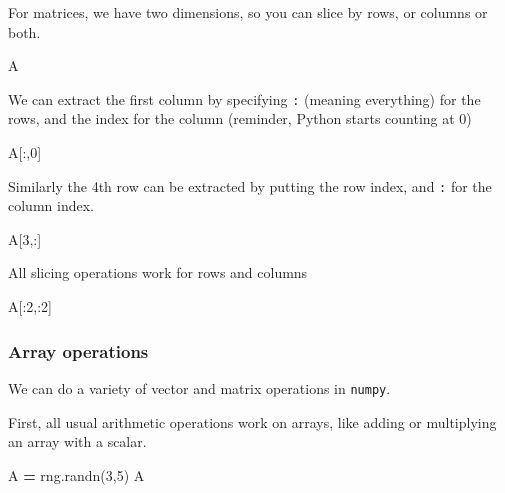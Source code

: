 \documentclass[
  letterpaper,
]{scrbook}
\newenvironment{Shaded}{\begin{snugshade}}{\end{snugshade}}
\newcommand{\DecValTok}[1]{\textcolor[rgb]{0.00,0.00,0.81}{#1}}
\newcommand{\NormalTok}[1]{#1}
\newcommand{\OperatorTok}[1]{\textcolor[rgb]{0.81,0.36,0.00}{\textbf{#1}}}
\begin{document}
For matrices, we have two dimensions, so you can slice by rows, or columns or both.

\begin{Shaded}
\begin{Highlighting}[]
\NormalTok{A}
\end{Highlighting}
\end{Shaded}

We can extract the first column by specifying \texttt{:} (meaning everything) for the rows, and the index for the column (reminder, Python starts counting at 0)

\begin{Shaded}
\begin{Highlighting}[]
\NormalTok{A[:,}\DecValTok{0}\NormalTok{]}
\end{Highlighting}
\end{Shaded}

Similarly the 4th row can be extracted by putting the row index, and \texttt{:} for the column index.

\begin{Shaded}
\begin{Highlighting}[]
\NormalTok{A[}\DecValTok{3}\NormalTok{,:]}
\end{Highlighting}
\end{Shaded}

All slicing operations work for rows and columns

\begin{Shaded}
\begin{Highlighting}[]
\NormalTok{A[:}\DecValTok{2}\NormalTok{,:}\DecValTok{2}\NormalTok{]}
\end{Highlighting}
\end{Shaded}

\hypertarget{array-operations}{%
\subsubsection{Array operations}\label{array-operations}}

We can do a variety of vector and matrix operations in \texttt{numpy}.

First, all usual arithmetic operations work on arrays, like adding or multiplying an array with a scalar.

\begin{Shaded}
\begin{Highlighting}[]
\NormalTok{A }\OperatorTok{=}\NormalTok{ rng.randn(}\DecValTok{3}\NormalTok{,}\DecValTok{5}\NormalTok{)}
\NormalTok{A}
\end{Highlighting}
\end{Shaded}
\end{document}
